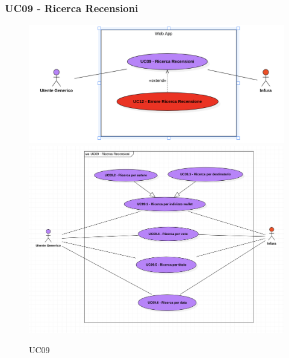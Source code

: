         \subsubsection{UC09 - Ricerca Recensioni}
        \label{UC09}

            \begin{figure}[H]
                \centering
                \includegraphics[scale=0.6]{src/img/UC09.png}
                \includegraphics[scale=0.4]{src/img/UC09.x.png}
                \caption{UC09}
            \end{figure}

